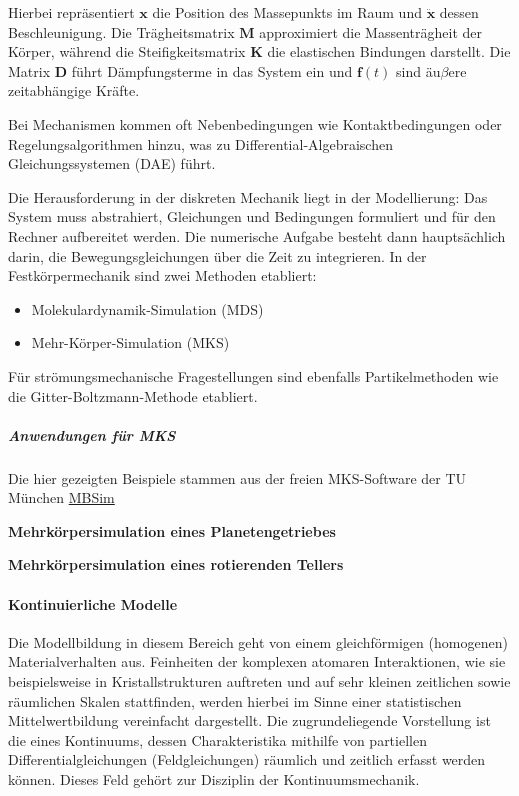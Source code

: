 Hierbei repräsentiert $\boldsymbol{x}$ die Position des Massepunkts im Raum und $\ddot{\boldsymbol{x}}$ dessen Beschleunigung. Die Trägheitsmatrix $\boldsymbol{M}$ approximiert die Massenträgheit der Körper, während die Steifigkeitsmatrix $\boldsymbol{K}$ die elastischen Bindungen darstellt. Die Matrix $\boldsymbol{D}$ führt Dämpfungsterme in das System ein und $\boldsymbol{f}(t)$ sind äu$\beta$ere zeitabhängige Kräfte.

Bei Mechanismen kommen oft Nebenbedingungen wie Kontaktbedingungen oder Regelungsalgorithmen hinzu, was zu Differential-Algebraischen Gleichungssystemen (DAE) führt.

Die Herausforderung in der diskreten Mechanik liegt in der Modellierung: Das System muss abstrahiert, Gleichungen und Bedingungen formuliert und für den Rechner aufbereitet werden. Die numerische Aufgabe besteht dann hauptsächlich darin, die Bewegungsgleichungen über die Zeit zu integrieren. In der Festkörpermechanik sind zwei Methoden etabliert:

\begin{itemize}
\item Molekulardynamik-Simulation (MDS) \cite{grotendorst2009multiscale}
\item Mehr-Körper-Simulation (MKS) \cite{shabana1997flexible}
\end{itemize}

Für strömungsmechanische Fragestellungen sind ebenfalls Partikelmethoden wie die Gitter-Boltzmann-Methode etabliert.


\subparagraph{Anwendungen für MKS}

Die hier gezeigten Beispiele stammen aus der freien MKS-Software der TU München \href{https://www.mbsim-env.de/}{MBSim}

\textbf{Mehrkörpersimulation eines Planetengetriebes}

\textbf{Mehrkörpersimulation eines rotierenden Tellers}

\paragraph{Kontinuierliche Modelle}

Die Modellbildung in diesem Bereich geht von einem gleichförmigen (homogenen) Materialverhalten aus. Feinheiten der komplexen atomaren Interaktionen, wie sie beispielsweise in Kristallstrukturen auftreten und auf sehr kleinen zeitlichen sowie räumlichen Skalen stattfinden, werden hierbei im Sinne einer statistischen Mittelwertbildung vereinfacht dargestellt. Die zugrundeliegende Vorstellung ist die eines Kontinuums, dessen Charakteristika mithilfe von partiellen Differentialgleichungen (Feldgleichungen) räumlich und zeitlich erfasst werden können. Dieses Feld gehört zur Disziplin der Kontinuumsmechanik.

